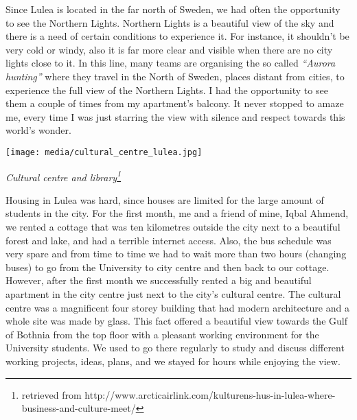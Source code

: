 \documentclass[10pt,a4paper]{article} %
\begin{document}
\begin{multicols}{3}
Since Lulea is located in the far north of Sweden, we had often the opportunity to 
see the Northern Lights. 
Northern Lights is a beautiful view of the sky and there is a need of certain 
conditions to experience it. 
For instance, it shouldn't be very cold or windy, also it is far more clear and visible 
when there are no city lights close to it. 
In this line, many teams are organising the so called \textit{``Aurora hunting''} 
where they travel in the North of Sweden, places distant from cities, to experience 
the full view of the Northern Lights. 
I had the opportunity to see them a couple of times from my apartment's balcony. 
It never stopped to amaze me, every time I was just starring the view with silence 
and respect towards this world's wonder.



\begin{center}
	\texttt{[image: media/cultural\_centre\_lulea.jpg]}
	\par\textit{Cultural centre and library\footnote{retrieved from http://www.arcticairlink.com/kulturens-hus-in-lulea-where-business-and-culture-meet/}}
\end{center}

Housing in Lulea was hard, since houses are limited for the large amount of 
students in the city. 
For the first month, me and a friend of mine, Iqbal Ahmend, we rented a cottage 
that was ten kilometres outside the city next to a beautiful forest and lake, and 
had a terrible internet access. 
Also, the bus schedule was very spare and from time to time we had to wait more 
than two hours (changing buses) to go from the University to city centre and then 
back to our cottage. 
However, after the first month we successfully rented a big and beautiful apartment 
in the city centre just next to the city's cultural centre. 
The cultural centre was a magnificent four storey building that had modern architecture and 
a whole site was made by glass. 
This fact offered a beautiful view towards the Gulf of Bothnia from the top floor with 
a pleasant working environment for the University students. 
We used to go there regularly to study and discuss different working projects, ideas, plans, 
and we stayed for hours while enjoying the view.


\end{multicols}
\end{document}
